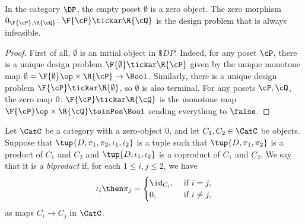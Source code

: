 \begin{lemma}
In the category $\DP$, the empty poset $\emptyset$ is a zero object. The zero morphism $0_{\F{\cP},\R{\cQ}}\colon \F{\cP} \tickar \R{\cQ}$ is the design problem that is always infeasible.
\end{lemma}
\begin{proof}
    First of all, $\emptyset$ is an initial object in $\$DP$. Indeed, for any poset $\cP $, there is a unique design problem $\F{\emptyset} \tickar \R{\cP} $ given by the unique monotone map $\emptyset=\F{\emptyset}\op\times \R{\cP} \to\Bool$. Similarly, there is a unique design problem $\F{\cP} \tickar \R{\emptyset}$, so $\emptyset$ is also terminal. For any posets $\cP ,\cQ $, the zero map $0 \colon \F{\cP} \tickar \R{\cQ}$ is the monotone map $\F{\cP} \op\times \R{\cQ} \toinPos \Bool$ sending everything to $\false$.
\end{proof}

\begin{shaded}
\begin{definition}[Biproduct]
Let $\CatC$ be a category with a zero-object $0$, and let $C_1,C_2\in\CatC$ be objects. Suppose that $\tup{D,\pi_1,\pi_2,\iota_1,\iota_2}$ is a tuple such that $\tup{D,\pi_1,\pi_2}$ is a product of $C_1$ and $C_2$ and $\tup{D,\iota_1,\iota_2}$ is a coproduct of $C_1$ and $C_2$. We say that it is a \emph{biproduct} if, for each $1\leq i,j\leq 2$, we have
\begin{equation}
\iota_i\then \pi_j=
\begin{cases}
	\id_{C_i}, &\text{ if }i=j,\\
	0, &\text{ if }i\neq j,
\end{cases} \label{eq:biproduct-condition}
\end{equation}
as maps $C_i\to C_j$ in $\CatC$.
\end{definition}
\end{shaded}

